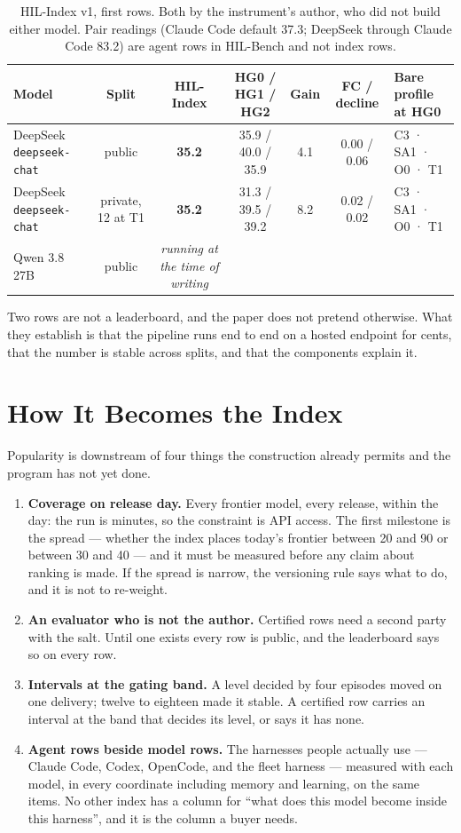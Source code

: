 \documentclass[11pt]{article}
\theoremstyle{definition}
\begin{document}
\begin{table}[H]
\centering\small
\begin{tabularx}{\textwidth}{@{}lcccccY@{}}
\toprule
Model & Split & \textbf{HIL-Index} & HG0 / HG1 / HG2 & Gain & FC / decline & Bare profile at HG0 \\
\midrule
DeepSeek \texttt{deepseek-chat} & public & \textbf{35.2} & 35.9 / 40.0 / 35.9 & 4.1 & 0.00 / 0.06 & C3 · SA1 · O0 · T1 \\
DeepSeek \texttt{deepseek-chat} & private, 12 at T1 & \textbf{35.2} & 31.3 / 39.5 / 39.2 & 8.2 & 0.02 / 0.02 & C3 · SA1 · O0 · T1 \\
Qwen 3.8 27B & public & \emph{running at the time of writing} & & & & \\
\bottomrule
\end{tabularx}
\caption{HIL-Index v1, first rows. Both by the instrument's author, who did not build either model. Pair readings (Claude Code default 37.3; DeepSeek through Claude Code 83.2) are agent rows in HIL-Bench and not index rows.}
\label{tab:rows}
\end{table}

Two rows are not a leaderboard, and the paper does not pretend otherwise. What they establish is that the pipeline runs end to end on a hosted endpoint for cents, that the number is stable across splits, and that the components explain it.

\section{How It Becomes the Index}\label{sec:plan}

Popularity is downstream of four things the construction already permits and the program has not yet done.

\begin{enumerate}[leftmargin=*,itemsep=3pt]
\item \textbf{Coverage on release day.} Every frontier model, every release, within the day: the run is minutes, so the constraint is API access. The first milestone is the spread --- whether the index places today's frontier between 20 and 90 or between 30 and 40 --- and it must be measured before any claim about ranking is made. If the spread is narrow, the versioning rule says what to do, and it is not to re-weight.
\item \textbf{An evaluator who is not the author.} Certified rows need a second party with the salt. Until one exists every row is public, and the leaderboard says so on every row.
\item \textbf{Intervals at the gating band.} A level decided by four episodes moved on one delivery; twelve to eighteen made it stable. A certified row carries an interval at the band that decides its level, or says it has none.
\item \textbf{Agent rows beside model rows.} The harnesses people actually use --- Claude Code, Codex, OpenCode, and the fleet harness --- measured with each model, in every coordinate including memory and learning, on the same items. No other index has a column for ``what does this model become inside this harness'', and it is the column a buyer needs.
\end{enumerate}
\end{document}

